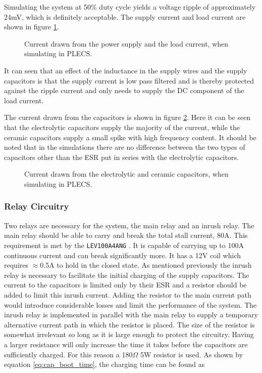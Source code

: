 Simulating the system at 50\% duty cycle yields a voltage ripple of approximately 24mV, which is definitely acceptable. 
The supply current and load current are shown in figure \ref{fig:supp_load_current}.

\begin{figure}[h]
	\centering
	
	\caption[Current simulation in PLECS.]{Current drawn from the power supply and the load current, when simulating in PLECS. }
	\label{fig:supp_load_current}
\end{figure}

It can seen that an effect of the inductance in the supply wires and the supply capacitors is that the supply current is low pass filtered and is thereby protected against the ripple current and only needs to supply the DC component of the load current.

The current drawn from the capacitors is shown in figure \ref{fig:cap_currents}.
Here it can be seen that the electrolytic capacitors supply the majority of the current, while the ceramic capacitors supply a small spike with high frequency content.
It should be noted that in the simulations there are no difference between the two types of capacitors other than the ESR put in series with the electrolytic capacitors. 

\begin{figure}[h]
	\centering
	
	\caption[Capacitor current simulation in PLECS.]{Current drawn from the electrolytic and ceramic capacitors, when simulating in PLECS. }
	\label{fig:cap_currents}
\end{figure}

\subsubsection{Relay Circuitry} %
\label{ssub:relay_circuitry}
Two relays are necessary for the system, the main relay and an inrush relay.
The main relay should be able to carry and break the total stall current, 80A.
This requirement is met by the \texttt{LEV100A4ANG} \cite{lev100}.
It is capable of carrying up to 100A continuous current and can break significantly more.
It has a 12V coil which requires $\approx$0.5A to hold in the closed state.
As mentioned previously the inrush relay is necessary to facilitate the initial charging of the supply capacitors.
The current to the capacitors is limited only by their ESR and a resistor should be added to limit this inrush current.
Adding the resistor to the main current path would introduce considerable losses and limit the performance of the system.
The inrush relay is implemented in parallel with the main relay to supply a temporary alternative current path in which the resistor is placed.
The size of the resistor is somewhat irrelevant so long as it is large enough to protect the circuitry.
Having a larger resistance will only increase the time it takes before the capacitors are sufficiently charged.
For this reason a 180$\Omega$ 5W resistor is used.
As shown by equation \ref{eq:cap_boot_time}, the charging time can be found as 

